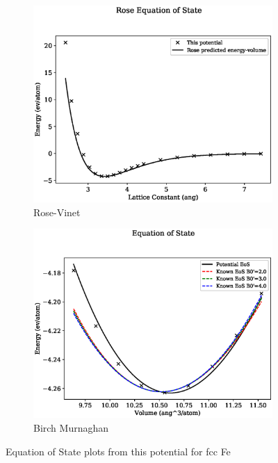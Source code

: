 \begin{figure}[htb]
\begin{subfigure}{.44\textwidth}
  \centering
  \includegraphics[width=.94\linewidth]{chapters/potentials_fe_pd_ru/feru_potential/eos/rose_plot_bp_1.eps}  
  \caption{Rose-Vinet}
  \label{fig:feru-fefcc-rose}
\end{subfigure}
\begin{subfigure}{.44\textwidth}
  \centering
  \includegraphics[width=.94\linewidth]{chapters/potentials_fe_pd_ru/feru_potential/eos/equation_of_state_bp_1.eps}  
  \caption{Birch Murnaghan}
  \label{fig:feru-fefcc-bmeos}
\end{subfigure}
\label{fig:feru-fefcc-equation-of-state}
\caption{Equation of State plots from this potential for \acrshort{fcc} Fe}
\end{figure}



